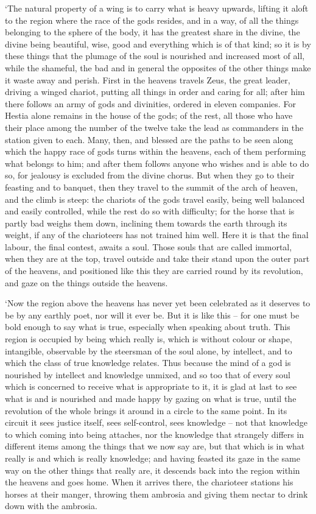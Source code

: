 ‘The natural property of a wing is to carry what is heavy upwards,
lifting it aloft to the region where the race of the gods resides, and
in a way, of all the
things belonging to the sphere of the body, it has the greatest share in
the divine, the divine  being beautiful, wise, good and
everything which is of that
kind; so it is by these
things that the plumage of the soul is nourished and increased most of
all, while the shameful, the bad and in general the opposites of the
other things make it waste away and perish. First in the heavens travels
Zeus, the  great leader, driving a winged chariot, putting all
things in order and caring for all; after him there follows an army of
gods and divinities, ordered in eleven companies. For Hestia 
alone remains in the
house of the gods; of the rest, all those who have their place among the
number of the twelve take the lead as commanders in the station given to
each. Many, then, and blessed are the paths to be seen along which the
happy race  of gods turns within the heavens, each of them
performing what belongs to him; and after them follows anyone who wishes
and is able to do so, for jealousy is excluded from the divine chorus.
But when they go to their feasting and to banquet, then they travel to
the summit of the arch of heaven, and the climb is  steep: the
chariots of the gods travel easily, being well balanced and easily
controlled, while the rest do so with difficulty; for the horse that is
partly bad weighs them down, inclining them towards the earth through
its weight, if any of the charioteers has not trained him well. Here it
is that the final labour,
 the final contest, awaits a soul. Those souls that are called
immortal, when they are
at the top, travel outside and take their stand upon the outer part of
the heavens, and positioned  like this they are carried round by
its revolution, and gaze on the things outside the heavens.

‘Now the region above the heavens has never yet been celebrated as it
deserves to be by any earthly poet, nor will it ever be. But it is like
this -- for one must be bold enough to say what  is true,
especially when speaking about truth. This region is occupied by being
which really is, which is without colour or shape, intangible,
observable by the steersman of the soul alone, by intellect, and to
which the class of true knowledge
relates.  Thus
because the mind of a god is nourished by intellect and knowledge
unmixed, and so too that of every soul which is concerned to receive
what is appropriate to it, it is glad at last to see what is and is
nourished and made happy by gazing on  what is true, until the
revolution of the whole brings it around in a circle to the same point.
In its circuit it sees justice itself, sees
self-control, sees
knowledge -- not that knowledge to which coming into being attaches, nor
the knowledge that  strangely differs in different items among
the things that we now say
are, but that which is
in what really is and which is really knowledge; and having feasted its
gaze in the same way on the other things that really are, it descends
back into the region within the heavens and goes home. When it arrives
there,  the charioteer stations his horses at their manger,
throwing them ambrosia and giving them nectar to drink down with the
ambrosia.


